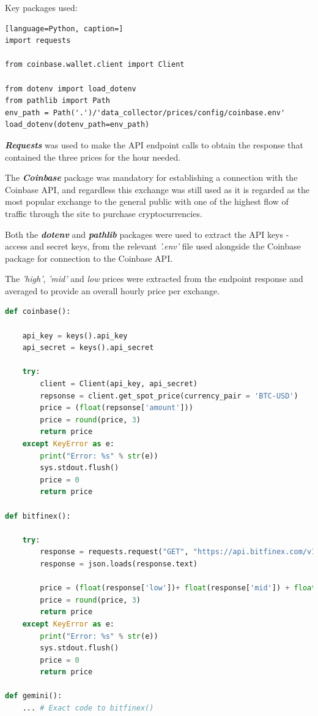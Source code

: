 \documentclass[oneside, 12pt]{article}
\begin{document}
			Key packages used:
			\begin{lstlisting}[language=Python, caption=]
import requests
				
from coinbase.wallet.client import Client
				
from dotenv import load_dotenv
from pathlib import Path 
env_path = Path('.')/'data_collector/prices/config/coinbase.env'
load_dotenv(dotenv_path=env_path)
			\end{lstlisting}
			
			\textbf{\textit{Requests}} was used to make the API endpoint calls to obtain the response that contained the three prices for the hour needed.
			
			The \textbf{\textit{Coinbase}} package was mandatory for establishing a connection with the Coinbase API, and regardless this exchange was still used as it is regarded as the most popular exchange to the general public with one of the highest flow of traffic through the site to purchase cryptocurrencies.
			
			Both the \textbf{\textit{dotenv}} and \textbf{\textit{pathlib}} packages were used to extract the API keys - access and secret keys, from the relevant \textit{'.env'} file used alongside the Coinbase package for connection to the Coinbase API.
			
			The \textit{'high'}, \textit{'mid'} and \textit{low} prices were extracted from the endpoint response and averaged to provide an overall hourly price per exchange.
			
			\begin{lstlisting}[language=Python, caption=Extraction of Price from exchanges]				
def coinbase():
				
	api_key = keys().api_key
	api_secret = keys().api_secret
				
	try:
		client = Client(api_key, api_secret)
		repsonse = client.get_spot_price(currency_pair = 'BTC-USD')
		price = (float(repsonse['amount']))
		price = round(price, 3)
		return price
	except KeyError as e:
		print("Error: %s" % str(e))
		sys.stdout.flush()
		price = 0
		return price
				
def bitfinex():
				
	try:
		response = requests.request("GET", "https://api.bitfinex.com/v1/pubticker/btcusd")
		response = json.loads(response.text)
				
		price = (float(response['low'])+ float(response['mid']) + float(response['high']))/3
		price = round(price, 3)
		return price
	except KeyError as e:
		print("Error: %s" % str(e))
		sys.stdout.flush()
		price = 0
		return price
				
def gemini():
	... # Exact code to bitfinex()
			\end{lstlisting}
			
\end{document}
